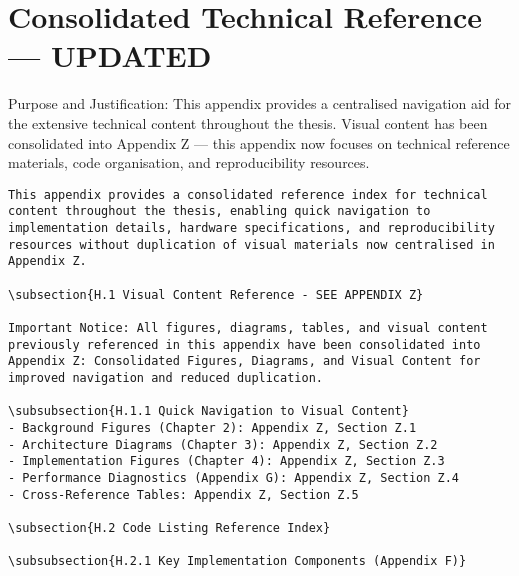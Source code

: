 \chapter{Consolidated Technical Reference — UPDATED}

Purpose and Justification: This appendix provides a centralised navigation aid for the extensive technical content throughout the thesis. Visual content has been consolidated into Appendix Z — this appendix now focuses on technical reference materials, code organisation, and reproducibility resources.


\begin{verbatim}
This appendix provides a consolidated reference index for technical content throughout the thesis, enabling quick navigation to implementation details, hardware specifications, and reproducibility resources without duplication of visual materials now centralised in Appendix Z.

\subsection{H.1 Visual Content Reference - SEE APPENDIX Z}

Important Notice: All figures, diagrams, tables, and visual content previously referenced in this appendix have been consolidated into Appendix Z: Consolidated Figures, Diagrams, and Visual Content for improved navigation and reduced duplication.

\subsubsection{H.1.1 Quick Navigation to Visual Content}
- Background Figures (Chapter 2): Appendix Z, Section Z.1
- Architecture Diagrams (Chapter 3): Appendix Z, Section Z.2
- Implementation Figures (Chapter 4): Appendix Z, Section Z.3
- Performance Diagnostics (Appendix G): Appendix Z, Section Z.4
- Cross-Reference Tables: Appendix Z, Section Z.5

\subsection{H.2 Code Listing Reference Index}

\subsubsection{H.2.1 Key Implementation Components (Appendix F)}


\end{verbatim}
